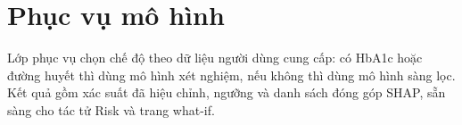 

\section{Phục vụ mô hình}

Lớp phục vụ chọn chế độ theo dữ liệu người dùng cung cấp: có HbA1c hoặc đường huyết thì dùng mô hình xét nghiệm, nếu không thì dùng mô hình sàng lọc. Kết quả gồm xác suất đã hiệu chỉnh, ngưỡng và danh sách đóng góp SHAP, sẵn sàng cho tác tử Risk và trang what-if.

